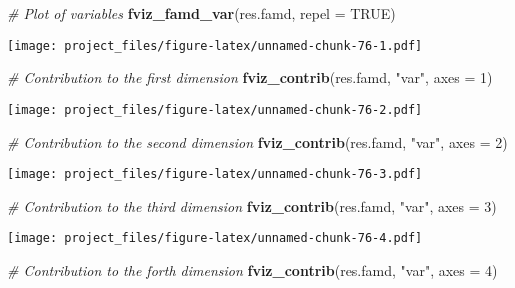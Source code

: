 \documentclass[
]{article}
\newenvironment{Shaded}{\begin{snugshade}}{\end{snugshade}}
\newcommand{\CommentTok}[1]{\textcolor[rgb]{0.56,0.35,0.01}{\textit{#1}}}
\newcommand{\DataTypeTok}[1]{\textcolor[rgb]{0.13,0.29,0.53}{#1}}
\newcommand{\DecValTok}[1]{\textcolor[rgb]{0.00,0.00,0.81}{#1}}
\newcommand{\KeywordTok}[1]{\textcolor[rgb]{0.13,0.29,0.53}{\textbf{#1}}}
\newcommand{\NormalTok}[1]{#1}
\newcommand{\OtherTok}[1]{\textcolor[rgb]{0.56,0.35,0.01}{#1}}
\newcommand{\StringTok}[1]{\textcolor[rgb]{0.31,0.60,0.02}{#1}}
\begin{document}
\begin{Shaded}
\begin{Highlighting}[]
\CommentTok{# Plot of variables}
\KeywordTok{fviz_famd_var}\NormalTok{(res.famd, }\DataTypeTok{repel =} \OtherTok{TRUE}\NormalTok{)}
\end{Highlighting}
\end{Shaded}

\texttt{[image: project\_files/figure-latex/unnamed-chunk-76-1.pdf]}

\begin{Shaded}
\begin{Highlighting}[]
\CommentTok{# Contribution to the first dimension}
\KeywordTok{fviz_contrib}\NormalTok{(res.famd, }\StringTok{"var"}\NormalTok{, }\DataTypeTok{axes =} \DecValTok{1}\NormalTok{)}
\end{Highlighting}
\end{Shaded}

\texttt{[image: project\_files/figure-latex/unnamed-chunk-76-2.pdf]}

\begin{Shaded}
\begin{Highlighting}[]
\CommentTok{# Contribution to the second dimension}
\KeywordTok{fviz_contrib}\NormalTok{(res.famd, }\StringTok{"var"}\NormalTok{, }\DataTypeTok{axes =} \DecValTok{2}\NormalTok{)}
\end{Highlighting}
\end{Shaded}

\texttt{[image: project\_files/figure-latex/unnamed-chunk-76-3.pdf]}

\begin{Shaded}
\begin{Highlighting}[]
\CommentTok{# Contribution to the third dimension}
\KeywordTok{fviz_contrib}\NormalTok{(res.famd, }\StringTok{"var"}\NormalTok{, }\DataTypeTok{axes =} \DecValTok{3}\NormalTok{)}
\end{Highlighting}
\end{Shaded}

\texttt{[image: project\_files/figure-latex/unnamed-chunk-76-4.pdf]}

\begin{Shaded}
\begin{Highlighting}[]
\CommentTok{# Contribution to the forth dimension}
\KeywordTok{fviz_contrib}\NormalTok{(res.famd, }\StringTok{"var"}\NormalTok{, }\DataTypeTok{axes =} \DecValTok{4}\NormalTok{)}
\end{Highlighting}
\end{Shaded}
\end{document}
